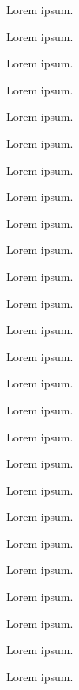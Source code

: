 
Lorem ipsum.


Lorem ipsum.


Lorem ipsum.


Lorem ipsum.


Lorem ipsum.


Lorem ipsum.


Lorem ipsum.


Lorem ipsum.


Lorem ipsum.


Lorem ipsum.


Lorem ipsum.


Lorem ipsum.


Lorem ipsum.


Lorem ipsum.


Lorem ipsum.


Lorem ipsum.


Lorem ipsum.


Lorem ipsum.


Lorem ipsum.


Lorem ipsum.


Lorem ipsum.


Lorem ipsum.


Lorem ipsum.


Lorem ipsum.


Lorem ipsum.


Lorem ipsum.
